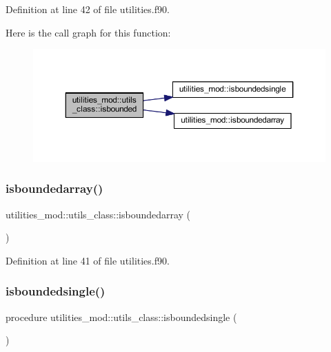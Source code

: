 Definition at line 42 of file utilities.\+f90.

Here is the call graph for this function\+:\nopagebreak
\begin{figure}[H]
\begin{center}
\leavevmode
\includegraphics[width=350pt]{structutilities__mod_1_1utils__class_acd0be828aa3a873c635cb9742ef06b13_cgraph}
\end{center}
\end{figure}
\mbox{\label{structutilities__mod_1_1utils__class_ae513529301733a624bcb1e984131edcd}} 
\subsubsection{\texorpdfstring{isboundedarray()}{isboundedarray()}}
{\footnotesize\ttfamily utilities\+\_\+mod\+::utils\+\_\+class\+::isboundedarray (\begin{DoxyParamCaption}{ }\end{DoxyParamCaption})\hspace{0.3cm}{\ttfamily [private]}}



Definition at line 41 of file utilities.\+f90.

\mbox{\label{structutilities__mod_1_1utils__class_aac36fc53d19b8bd8c37a2dfcf74f1fcc}} 
\subsubsection{\texorpdfstring{isboundedsingle()}{isboundedsingle()}}
{\footnotesize\ttfamily procedure utilities\+\_\+mod\+::utils\+\_\+class\+::isboundedsingle (\begin{DoxyParamCaption}{ }\end{DoxyParamCaption})\hspace{0.3cm}{\ttfamily [private]}}



